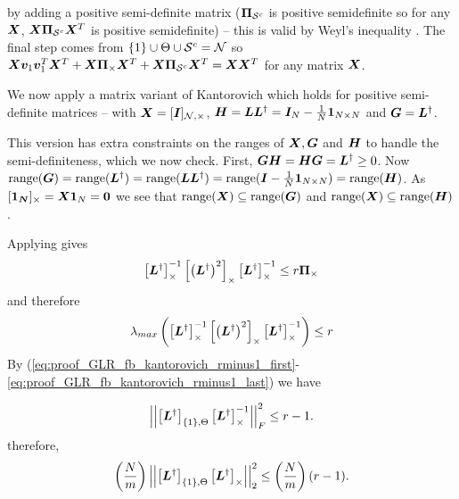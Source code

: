  by adding a positive semi-definite matrix  ($\projgen{\set{S}^{c}}$ is positive semidefinite so for any $\bm{X}$, $\matr{X}\projgen{\set{S}^{c}}\matr{X}^{T}$ is positive semidefinite) -- this is valid by Weyl's inequality \cite[Corollary III.2.2, page 63]{bhatia2013matrix}. The final step comes from $\{1\} \cup \Theta \cup \mathcal{S}^{c} = \mathcal{N}$ so $\matr{X}\vect{v}_{1}\vect{v}_{1}^{T}\matr{X}^{T} + \matr{X}\proj{\Theta}\matr{X}^{T} + \matr{X}\projgen{\set{S}^{c}}\matr{X}^{T} = \matr{X}\matr{X}^{T}$ for any matrix $\bm{X}$.

 We now apply a matrix variant of Kantorovich which holds for positive semi-definite matrices -- \cite[Theorem 3]{liu1997kantorovich} with $\matr{X} = \matrsub[N,\Theta]{I}$,  $\bm{H} = \bm{L}\bm{L}^{\dagger} =\bm{I}_{N} - \frac{1}{N}\bm{1}_{N \times N}$ and $\bm{G} = \bm{L}^{\dagger}$. 
 
 This version has extra constraints on the ranges of $\bm{X}, \bm{G}$ and $\bm{H}$ to handle the semi-definiteness, which we now check. First, $\bm{G}\bm{H} = \bm{H}\bm{G}  = \bm{L}^{\dagger} \geq 0$.   Now $\text{range}(\bm{G}) = \text{range}(\bm{L}^{\dagger}) = \text{range}(\bm{L}\bm{L}^{\dagger}) = \text{range}(\bm{I}-\frac{1}{N}\bm{1}_{N \times N}) = \text{range}(\bm{H})$. As $\vectsub[\Theta]{1_{N}} = \matr{X}\vect{1}_{N} = \vect{0}$ we see that $\text{range}(\bm{X})\subseteq \text{range}(\bm{G})$ and $\text{range}(\bm{X})\subseteq \text{range}(\bm{H})$. 

 Applying \cite[Theorem 3]{liu1997kantorovich} gives
 \begin{equation}
     \msub[\Theta]{\matr{L}^{\dagger}}^{-1}\msub[\Theta]{\left(\matr{L}^{\dagger}\right)^{2}}\msub[\Theta]{\matr{L}^{\dagger}}^{-1} \leq r \proj{\Theta}
 \end{equation}
 and therefore
 \begin{equation}
     \lambda_{max}\left( \msub[\Theta]{\matr{L}^{\dagger}}^{-1}\msub[\Theta]{\left(\matr{L}^{\dagger}\right)^{2}}\msub[\Theta]{\matr{L}^{\dagger}}^{-1}\right) \leq r 
 \end{equation}
By (\ref{eq:proof_GLR_fb_kantorovich_rminus1_first}-\ref{eq:proof_GLR_fb_kantorovich_rminus1_last}) we have

\begin{equation}
    \sqfrob{\msubgen[\{1\},\Theta]{\matr{L}^{\dagger}}\msub[\Theta]{\matr{L}^{\dagger}}^{-1}} \leq r-1.
\end{equation}
therefore, 
\begin{equation}
\left(\frac{N}{m}\right) \sqnormvec{\msubgen[\{1\}, \Theta]{\matr{L}^{\dagger}}\msub[\Theta]{\matr{L}^{\dagger}}}
\leq \left(\frac{N}{m} \right)(r-1).
\end{equation}


